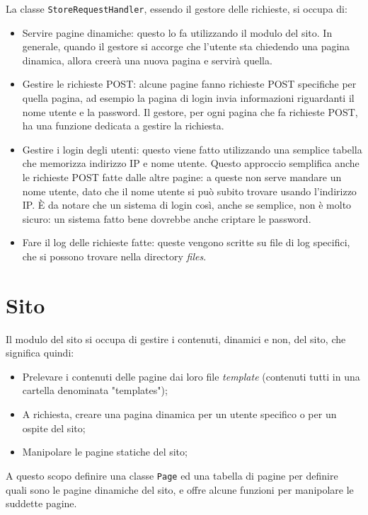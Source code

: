 \documentclass[a4paper,12pt]{report}
\begin{document}
La classe \texttt{StoreRequestHandler}, essendo il gestore delle richieste, si occupa di:
\begin{itemize}
\item Servire pagine dinamiche: questo lo fa utilizzando il modulo del sito. In generale, quando il gestore si accorge che l'utente sta chiedendo una pagina dinamica, allora creerà una nuova pagina e servirà quella.
\item Gestire le richieste POST: alcune pagine fanno richieste POST specifiche per quella pagina, ad esempio la pagina di login invia informazioni riguardanti il nome utente e la password. Il gestore, per ogni pagina che fa richieste POST, ha una funzione dedicata a gestire la richiesta.
\item Gestire i login degli utenti: questo viene fatto utilizzando una semplice tabella che memorizza indirizzo IP e nome utente. Questo approccio semplifica anche le richieste POST fatte dalle altre pagine: a queste non serve mandare un nome utente, dato che il nome utente si può subito trovare usando l'indirizzo IP. È da notare che un sistema di login così, anche se semplice, non è molto sicuro: un sistema fatto bene dovrebbe anche criptare le password.
\item Fare il log delle richieste fatte: queste vengono scritte su file di log specifici, che si possono trovare nella directory \textit{files}.
\end{itemize}

\section{Sito}

Il modulo del sito si occupa di gestire i contenuti, dinamici e non, del sito, che significa quindi:

\begin{itemize}
\item Prelevare i contenuti delle pagine dai loro file \textit{template} (contenuti tutti in una cartella denominata "templates");
\item A richiesta, creare una pagina dinamica per un utente specifico o per un ospite del sito;
\item Manipolare le pagine statiche del sito;
\end{itemize}

A questo scopo definire una classe \texttt{Page} ed una tabella di pagine per definire quali sono le pagine dinamiche del sito, e offre alcune funzioni per manipolare le suddette pagine.
\end{document}

